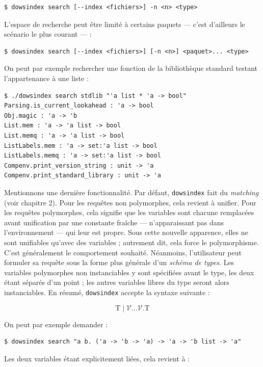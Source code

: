 \documentclass[a4paper]{report}
\theoremstyle{definition}
\newcommand{\dowsindex}{\texttt{dowsindex}\xspace}
\newcommand{\V}{\mathscr{V}}
\newcommand{\T}{\mathrm{T}}
\begin{document}
\begin{verbatim}
$ dowsindex search [--index <fichiers>] -n <n> <type>
\end{verbatim}

L'espace de recherche peut être limité à certains paquets — c'est d'ailleurs le scénario le plus courant — :

\begin{verbatim}
$ dowsindex search [--index <fichiers>] [-n <n>] <paquet>... <type>
\end{verbatim}

On peut par exemple rechercher une fonction de la bibliothèque standard testant l'appartenance à une liste :

\begin{verbatim}
$ ./dowsindex search stdlib "'a list * 'a -> bool"
Parsing.is_current_lookahead : 'a -> bool
Obj.magic : 'a -> 'b
List.mem : 'a -> 'a list -> bool
List.memq : 'a -> 'a list -> bool
ListLabels.mem : 'a -> set:'a list -> bool
ListLabels.memq : 'a -> set:'a list -> bool
Compenv.print_version_string : unit -> 'a
Compenv.print_standard_library : unit -> 'a
\end{verbatim}

Mentionnons une dernière fonctionnalité. Par défaut, \dowsindex fait du \emph{matching} (voir chapitre 2). Pour les requêtes non polymorphes, cela revient à unifier. Pour les requêtes polymorphes, cela signifie que les variables sont chacune remplacées avant unification par une constante fraîche — n'apparaissant pas dans l'environnement — qui leur est propre. Sous cette nouvelle apparence, elles ne sont unifiables qu'avec des variables ; autrement dit, cela force le polymorphisme. C'est généralement le comportement souhaité. Néanmoins, l'utilisateur peut formuler sa requête sous la forme plus générale d'un \emph{schéma de types}. Les variables polymorphes non instanciables y sont spécifiées avant le type, les deux étant séparés d'un point ; les autres variables libres du type seront alors instanciables. En résumé, \dowsindex accepte la syntaxe suivante :

\[ \T \mid \V \dots \V \texttt{.} \T \]

On peut par exemple demander :

\begin{verbatim}
$ dowsindex search "a b. ('a -> 'b -> 'a) -> 'a -> 'b list -> 'a"
\end{verbatim}

Les deux variables étant explicitement liées, cela revient à :
\end{document}
